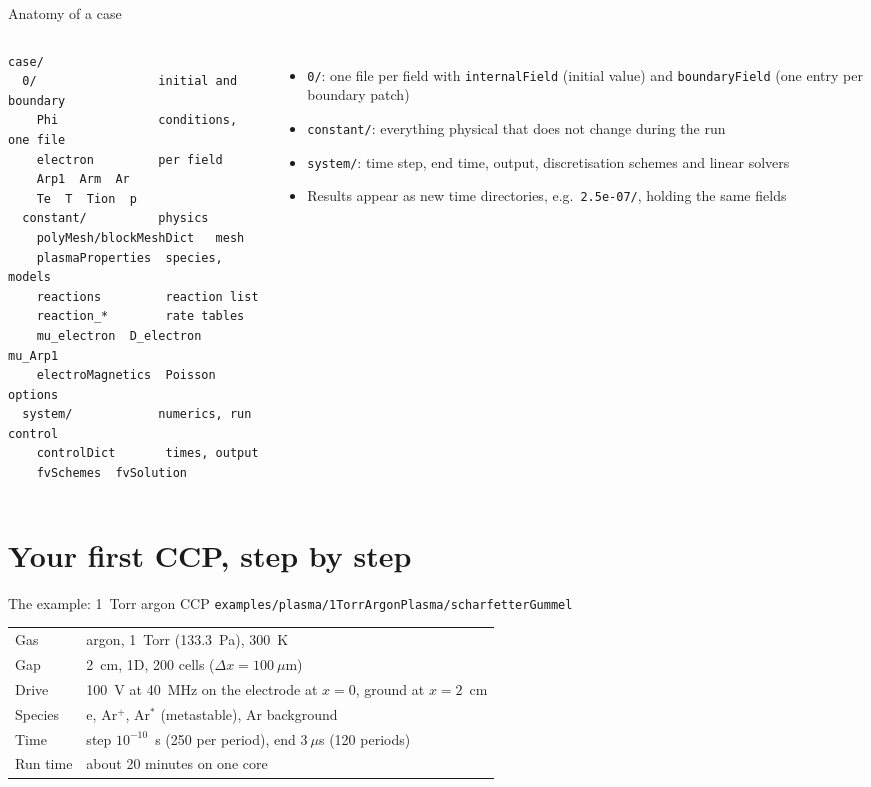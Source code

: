 \documentclass[aspectratio=169,11pt]{beamer}
\newcommand{\kw}[1]{\texttt{#1}}
\begin{document}
\begin{frame}[fragile]{Anatomy of a case}
  \begin{columns}
    \begin{lstlisting}
case/
  0/                 initial and boundary
    Phi              conditions, one file
    electron         per field
    Arp1  Arm  Ar
    Te  T  Tion  p
  constant/          physics
    polyMesh/blockMeshDict   mesh
    plasmaProperties  species, models
    reactions         reaction list
    reaction_*        rate tables
    mu_electron  D_electron  mu_Arp1
    electroMagnetics  Poisson options
  system/            numerics, run control
    controlDict       times, output
    fvSchemes  fvSolution
    \end{lstlisting}
    \small
    \begin{itemize}
      \item \kw{0/}: one file per field with \kw{internalField} (initial value) and
            \kw{boundaryField} (one entry per boundary patch)
      \item \kw{constant/}: everything physical that does not change during the run
      \item \kw{system/}: time step, end time, output, discretisation schemes and
            linear solvers
      \item Results appear as new time directories, e.g.\ \kw{2.5e-07/}, holding
            the same fields
    \end{itemize}
  \end{columns}
\end{frame}

\section{Your first CCP, step by step}

\begin{frame}{The example: 1~Torr argon CCP}
  \kw{examples/plasma/1TorrArgonPlasma/scharfetterGummel}
  \vspace{0.5em}
  \begin{center}
  \begin{tabular}{ll}
    \toprule
    Gas & argon, 1~Torr (133.3~Pa), 300~K \\
    Gap & 2~cm, 1D, 200 cells ($\Delta x=100~\mu$m) \\
    Drive & 100~V at 40~MHz on the electrode at $x=0$, ground at $x=2$~cm \\
    Species & e, Ar$^+$, Ar$^*$ (metastable), Ar background \\
    Time & step $10^{-10}$~s (250 per period), end $3~\mu$s (120 periods) \\
    Run time & about 20 minutes on one core \\
    \bottomrule
  \end{tabular}
  \end{center}
\end{frame}
\end{document}
